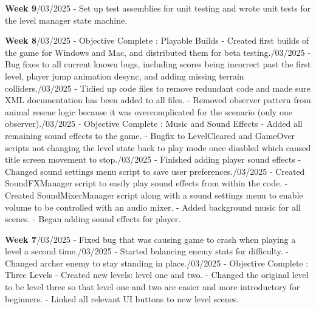 \documentclass[10pt]{final_report}
\begin{document}
\textbf{Week 9}/03/2025
\newline- Set up test assemblies for unit testing and wrote unit tests for the level manager state machine.

\textbf{Week 8}/03/2025 - Objective Complete : Playable Builds
\newline- Created first builds of the game for Windows and Mac, and distributed them for beta testing./03/2025
\newline- Bug fixes to all current known bugs, including scores being incorrect past the first level, player jump animation desync, and adding missing terrain colliders./03/2025
\newline- Tidied up code files to remove redundant code and made sure XML documentation has been added to all files.
\newline- Removed observer pattern from animal rescue logic because it was overcomplicated for the scenario (only one observer)./03/2025 - Objective Complete : Music and Sound Effects
\newline- Added all remaining sound effects to the game.
\newline- Bugfix to LevelCleared and GameOver scripts not changing the level state back to play mode once disabled which caused title screen movement to stop./03/2025
\newline- Finished adding player sound effects
\newline- Changed sound settings menu script to save user preferences./03/2025
\newline- Created SoundFXManager script to easily play sound effects from within the code.
\newline- Created SoundMixerManager script along with a sound settings menu to enable volume to be controlled with an audio mixer.
\newline- Added background music for all scenes.
\newline- Began adding sound effects for player.

\textbf{Week 7}/03/2025
\newline- Fixed bug that was causing game to crash when playing a level a second time./03/2025
\newline- Started balancing enemy stats for difficulty.
\newline- Changed archer enemy to stay standing in place./03/2025 - Objective Complete : Three Levels
\newline- Created new levels: level one and two.
\newline- Changed the original level to be level three so that level one and two are easier and more introductory for beginners.
\newline- Linked all relevant UI buttons to new level scenes.
\end{document}
